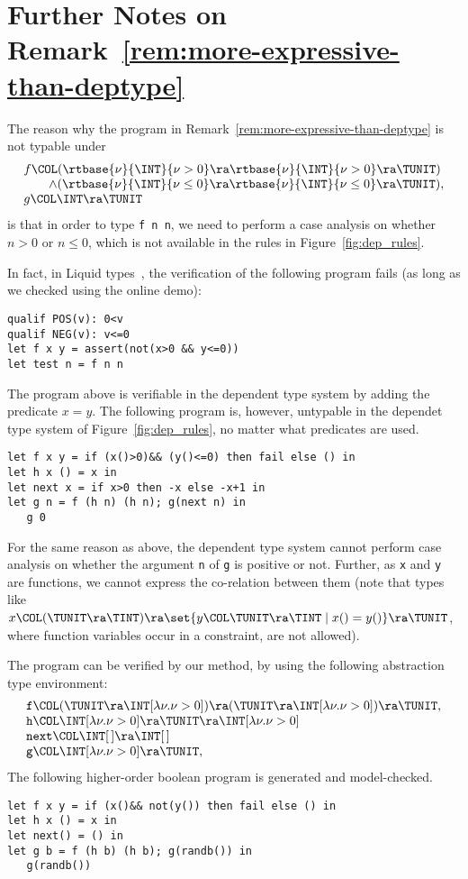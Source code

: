 \section{Further Notes on Remark~\ref{rem:more-expressive-than-deptype}}
\label{sec:expressive-power}

The reason why the program in Remark~\ref{rem:more-expressive-than-deptype}
is not typable under
\[
\begin{array}{l}
f\COL (\rtbase{\nu}{\INT}{\nu>0} \ra \rtbase{\nu}{\INT}{\nu>0}\ra \TUNIT)\\
\qquad
      \land (\rtbase{\nu}{\INT}{\nu\leq 0} \ra \rtbase{\nu}{\INT}{\nu\leq 0}\ra \TUNIT),\\
g\COL \INT \ra \TUNIT
\end{array}
\]
is that in order to type \texttt{f n n}, we need to perform a case analysis on
whether \(n>0\) or \(n\leq 0\), which is not available in the rules in Figure~\ref{fig:dep_rules}.

In fact, in Liquid types~\cite{Rondon2008}, the verification of the following program fails
(as long as we checked using the online demo):
\begin{verbatim}
qualif POS(v): 0<v
qualif NEG(v): v<=0
let f x y = assert(not(x>0 && y<=0))
let test n = f n n
\end{verbatim}

The program above is verifiable in the dependent type system by adding the predicate \(x=y\).
The following program is, however, untypable in the dependet type system of Figure~\ref{fig:dep_rules},
no matter what predicates are used.
\begin{verbatim}
let f x y = if (x()>0)&& (y()<=0) then fail else () in
let h x () = x in
let next x = if x>0 then -x else -x+1 in
let g n = f (h n) (h n); g(next n) in
   g 0
\end{verbatim}
For the same reason as above, the dependent type system cannot perform case analysis on
whether the argument \texttt{n} of \texttt{g} is positive or not. Further, as \texttt{x} and \texttt{y}
are functions, we cannot express the co-relation between them (note that 
types like \(x\COL(\TUNIT\ra \TINT)\ra \set{y\COL \TUNIT\ra \TINT\mid x()=y()}\ra \TUNIT\),
where function variables occur in a constraint, are not allowed).


The program can be verified by our method, by using the following abstraction type environment:
\[
\begin{array}{l}
\texttt{f}\COL (\TUNIT\ra \INT[\lambda \nu.\nu>0]) \ra (\TUNIT\ra \INT[\lambda \nu.\nu>0]) \ra \TUNIT,\\
\texttt{h}\COL \INT[\lambda \nu.\nu>0] \ra \TUNIT \ra \INT[\lambda \nu.\nu>0] \\
\texttt{next}\COL \INT[\,] \ra \INT[\,] \\
\texttt{g}\COL \INT[\lambda \nu.\nu>0] \ra \TUNIT,
\end{array}
\]
The following higher-order boolean program is generated and model-checked.
\begin{verbatim}
let f x y = if (x()&& not(y()) then fail else () in
let h x () = x in
let next() = () in
let g b = f (h b) (h b); g(randb()) in
   g(randb())
\end{verbatim}
